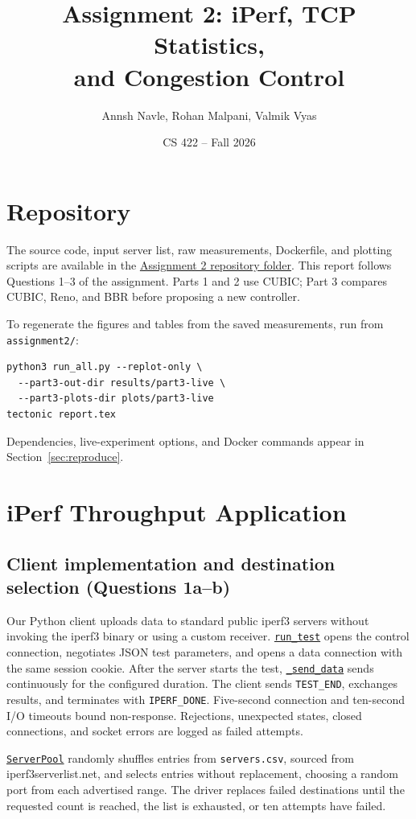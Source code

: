 \documentclass[11pt,letterpaper]{article}
\title{Assignment 2: iPerf, TCP Statistics,\\and Congestion Control}
\author{Annsh Navle, Rohan Malpani, Valmik Vyas}
\date{CS 422 -- Fall 2026}
\newcommand{\codelink}[2]{\href{https://github.com/RohMalpani/CS422Assignments/blob/main/assignment2/#2}{#1}}
\begin{document}
\maketitle
\section*{Repository}
The source code, input server list, raw measurements, Dockerfile, and plotting
scripts are available in the
\href{https://github.com/RohMalpani/CS422Assignments/tree/main/assignment2}{Assignment 2 repository folder}.
This report follows Questions 1--3 of the assignment. Parts 1 and 2 use CUBIC;
Part 3 compares CUBIC, Reno, and BBR before proposing a new controller.

To regenerate the figures and tables from the saved measurements, run from
\texttt{assignment2/}:
\begin{verbatim}
python3 run_all.py --replot-only \
  --part3-out-dir results/part3-live \
  --part3-plots-dir plots/part3-live
tectonic report.tex
\end{verbatim}
Dependencies, live-experiment options, and Docker commands appear in Section~\ref{sec:reproduce}.


\section{iPerf Throughput Application}

\subsection{Client implementation and destination selection (Questions 1a--b)}

Our Python client uploads data to standard public iperf3 servers without
invoking the iperf3 binary or using a custom receiver.
\codelink{\texttt{run\_test}}{part1/iperf3_client.py\#L91} opens the control
connection, negotiates JSON test parameters, and opens a data connection with
the same session cookie. After the server starts the test,
\codelink{\texttt{\_send\_data}}{part1/iperf3_client.py\#L162} sends continuously
for the configured duration. The client sends \texttt{TEST\_END}, exchanges
results, and terminates with \texttt{IPERF\_DONE}. Five-second connection and
ten-second I/O timeouts bound non-response. Rejections, unexpected states,
closed connections, and socket errors are logged as failed attempts.


\codelink{\texttt{ServerPool}}{part1/select_servers.py\#L44} randomly shuffles
entries from \texttt{servers.csv}, sourced from iperf3serverlist.net, and selects
entries without replacement, choosing a random port from each advertised range.
The driver replaces failed destinations until the requested count is reached,
the list is exhausted, or ten attempts have failed.
\end{document}
